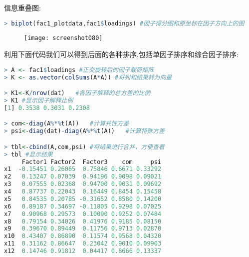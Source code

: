 \documentclass[11pt,a4paper,oneside]{book}
\begin{document}
信息重叠图:
\begin{lstlisting}[language=r]
> biplot(fac1_plotdata,fac1$loadings) #因子得分图和原坐标在因子方向上的图
\end{lstlisting}
\begin{figure}[H]
	\centering
	\texttt{[image: screenshot080]}
\end{figure}

利用下面代码我们可以得到后面的各种排序,包括单因子排序和综合因子排序:
\begin{lstlisting}[language=r]
> A <- fac1$loadings #正交旋转后的因子载荷矩阵
> K <- as.vector(colSums(A*A)) #将列和结果转为向量 

> K1<-K/nrow(dat)   #各因子解释的总方差的比例
> K1 #显示因子解释比例
[1] 0.3538 0.3031 0.2308

> com<-diag(A%*%t(A))   #计算共性方差
> psi<-diag(dat)-diag(A%*%t(A))   #计算特殊方差

> tbl<-cbind(A,com,psi) #将结果进行合并，方便查看
> tbl #显示结果
     Factor1 Factor2  Factor3    com     psi
x1  -0.15451 0.26065  0.75846 0.6671 0.33292
x2   0.13247 0.07039  0.94196 0.9098 0.09021
x3   0.07555 0.02368  0.94700 0.9031 0.09692
x4   0.87737 0.22043  0.16449 0.8454 0.15458
x5   0.84535 0.20785 -0.31652 0.8580 0.14200
x6   0.89187 0.34697 -0.11805 0.9298 0.07025
x7   0.90968 0.29573  0.10090 0.9252 0.07484
x8   0.79154 0.34026  0.41976 0.9185 0.08150
x9   0.39670 0.89449  0.11756 0.9713 0.02870
x10  0.43407 0.86890  0.11574 0.9568 0.04320
x11  0.31162 0.86647  0.23042 0.9010 0.09903
x12  0.14746 0.91812  0.04417 0.8666 0.13337
\end{lstlisting}
\end{document}
